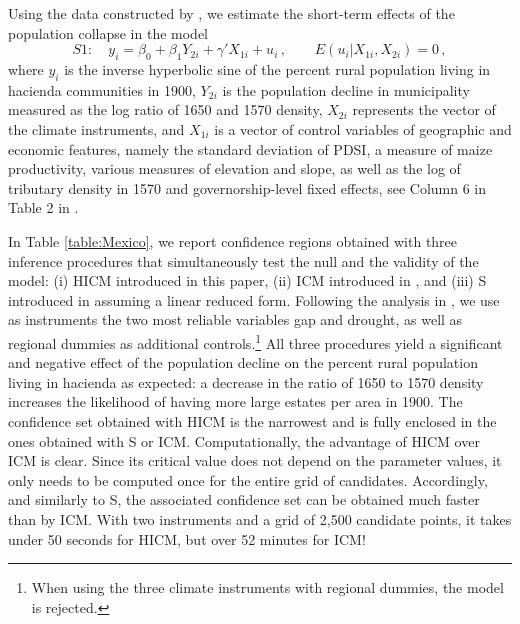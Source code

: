 \documentclass[12pt]{article}
\newcommand{\1}{\mathbf{1}}
\begin{document}
Using the data constructed by \cite{Mexico}, we estimate the
short-term effects of the population collapse in the model
\begin{equation} \label{eq:mexicomainlinear}
S1:\quad y_i = \beta_0 + \beta_1 Y_{2i} + \gamma' X_{1i} + u_i \, ,
\qquad E(u_i|X_{1i},X_{2i})=0 \, ,
\end{equation}
where $y_i$ is the inverse hyperbolic sine of the percent rural
population living in hacienda communities in 1900, $Y_{2i}$ is the
population decline in municipality measured as the log ratio of 1650
and 1570 density, $X_{2i}$ represents the vector of the climate
instruments, and $X_{1i}$ is a vector of control variables of
geographic and economic features, namely the standard deviation of
PDSI, a measure of maize productivity, various measures of elevation
and slope, as well as the log of tributary density in 1570 and
governorship-level fixed effects, see Column 6 in Table 2 in
\cite{Mexico}.

In Table \ref{table:Mexico}, we report confidence regions obtained
with three inference procedures that simultaneously test the null and
the validity of the model: (i) HICM introduced in this paper, (ii) ICM
introduced in \cite{antoine_identification-robust_2023}, and (iii) S introduced in
\cite{SW} assuming a linear reduced form. Following the analysis in
\cite{antoine_identification-robust_2023}, we use as instruments the
two most reliable variables gap and drought, as well as regional
dummies as additional controls.\footnote{When using the three climate instruments with
regional dummies, the model is rejected.}  All three procedures yield
a significant and negative effect of the population decline on the
percent rural population living in hacienda as expected: a decrease in
the ratio of 1650 to 1570 density increases the likelihood of having
more large estates per area in 1900. The confidence set obtained with
HICM is the narrowest and  is fully enclosed in the ones obtained
with S or ICM. Computationally, the advantage of HICM over ICM is clear. Since its
critical value does not depend on the parameter values, it only needs
to be computed once for the entire grid of candidates. Accordingly, and
similarly to S, the associated confidence set can be obtained much
faster than by ICM.  With two instruments and  a grid of 2,500
candidate points,  it takes under 50 seconds for HICM, but over 52 minutes for ICM! %
\end{document}
